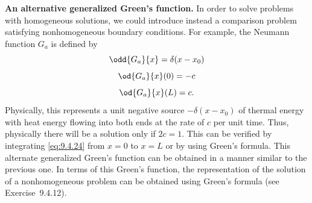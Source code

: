 \textbf{An alternative generalized Green's function.}
In order to solve problems with homogeneous solutions, we could introduce instead a comparison problem satisfying nonhomogeneous boundary conditions.  For example, the Neumann function $G_a$ is defined by
\begin{equation}
\label{eq:9.4.24}
\odd{G_a}{x} = \delta(x-x_0)
\end{equation}
\begin{equation}
\label{eq:9.4.25}
\od{G_a}{x}(0) = -c
\end{equation}
\begin{equation}
\label{eq:9.4.26}
\od{G_a}{x}(L) = c.
\end{equation}
Physically, this represents a unit negative source $-\delta(x-x_0)$ of thermal energy with heat energy flowing into both ends at the rate of $c$ per unit time.  Thus, physically there will be a solution only if $2c = 1$.  This can be verified by integrating \eqref{eq:9.4.24} from $x=0$ to $x=L$ or by using Green's formula.  This alternate generalized Green's function can be obtained in a manner similar to the previous one.  In terms of this Green's function, the representation of the solution of a nonhomogeneous problem can be obtained using Green's formula (see Exercise~9.4.12).

